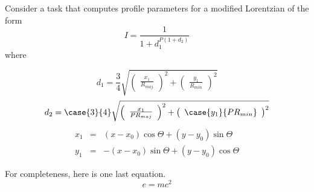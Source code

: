Consider a task that computes profile parameters for a modified
Lorentzian of the form
\begin{equation}
I = \frac{1}{1 + d_{1}^{P (1 + d_{2} )}}
\end{equation}
where
\begin{mathletters}
\begin{displaymath}
d_{1} = \frac{3}{4} \sqrt{ \left( \begin{array}{c} \frac{x_{1}}{R_{maj}} 
\end{array} \right) ^{2} + 
\left( \begin{array}{c} \frac{y_{1}}{R_{min}} \end{array} \right) ^{2} }
\end{displaymath}
\begin{equation}
d_{2} = \case{3}{4} \sqrt{ \left( \begin{array}{c} \frac{x_{1}}{P R_{maj}}
\end{array} \right) ^{2} + 
\left( \begin{array}{c} \case{y_{1}}{P R_{min}} \end{array} \right) ^{2} }
\end{equation}
\begin{eqnarray}
x_{1} & = & (x - x_{0}) \cos \Theta + (y - y_{0}) \sin \Theta \\ 
y_{1} & = & -(x - x_{0}) \sin \Theta + (y - y_{0}) \cos \Theta 
\end{eqnarray}
\end{mathletters}

For completeness, here is one last equation.
\begin{equation}
e = mc^2
\end{equation}

